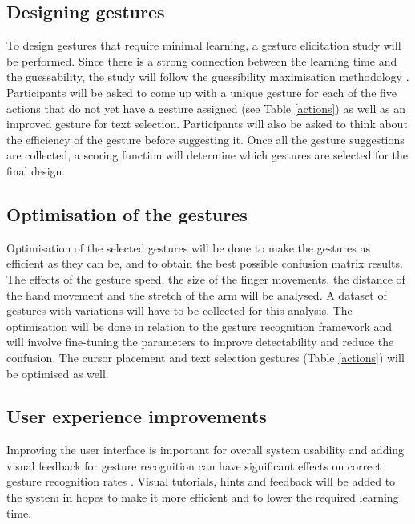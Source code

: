 \documentclass[a4paper, 12pt]{article}
\begin{document}
\vspace{-0.3cm}
\subsection{Designing gestures}
To design gestures that require minimal learning, a gesture elicitation study will be performed. Since there is a strong connection between the learning time and the guessability, the study will follow the guessibility maximisation methodology \cite{guessability}. Participants will be asked to come up with a unique gesture for each of the five actions that do not yet have a gesture assigned (see Table \ref{actions}) as well as an improved gesture for text selection. Participants will also be asked to think about the efficiency of the gesture before suggesting it. Once all the gesture suggestions are collected, a scoring function will determine which gestures are selected for the final design.

\vspace{-0.3cm}
\subsection{Optimisation of the gestures}
Optimisation of the selected gestures will be done to make the gestures as efficient as they can be, and to obtain the best possible confusion matrix results. The effects of the gesture speed, the size of the finger movements, the distance of the hand movement and the stretch of the arm will be analysed. A dataset of gestures with variations will have to be collected for this analysis. The optimisation will be done in relation to the gesture recognition framework and will involve fine-tuning the parameters to improve detectability and reduce the confusion. The cursor placement and text selection gestures (Table \ref{actions}) will be optimised as well.

\vspace{-0.3cm}
\subsection{User experience improvements}
Improving the user interface is important for overall system usability and adding visual feedback for gesture recognition can have significant effects on correct gesture recognition rates \cite{feedback}. Visual tutorials, hints and feedback will be added to the system in hopes to make it more efficient and to lower the required learning time.

\vspace{-0.3cm}
\end{document}
